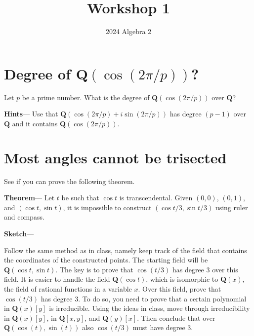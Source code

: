 \documentclass[12pt]{amsart}
\author{2024 Algebra 2}
\date{}
\title{Workshop 1}
\begin{document}
\maketitle
\section{Degree of \(\mathbf{Q}(\cos (2\pi/p))\)?}
\label{sec:org034cca3}
Let \(p\) be a prime number.
What is the degree of \(\mathbf{Q}(\cos (2\pi/p))\) over \(\mathbf{Q}\)?

\textbf{\textbf{Hints}}---
Use that \(\mathbf{Q}(\cos(2\pi/p) + i \sin(2\pi/p))\) has degree \((p-1)\) over \(\mathbf{Q}\) and it contains \(\mathbf{Q}(\cos(2\pi/p))\).
\section{Most angles cannot be trisected}
\label{sec:org6594949}
See if you can prove the following theorem.

\textbf{\textbf{Theorem}}---
Let \(t\) be such that \(\cos t\) is transcendental.
Given \((0,0)\), \((0,1)\), and \((\cos t, \sin t)\), it is impossible to construct \((\cos t/3, \sin t/3)\) using ruler and compass.

\textbf{\textbf{Sketch}}---

Follow the same method as in class, namely keep track of the field that contains the coordinates of the constructed points.
The starting field will be \(\mathbf{Q}(\cos t, \sin t)\).
The key is to prove that \(\cos (t/3)\) has degree 3 over this field.
It is easier to handle the field \(\mathbf{Q}(\cos t)\), which is isomorphic to \(\mathbf{Q}(x)\), the field of rational functions in a variable \(x\).
Over this field, prove that \(\cos(t/3)\) has degree 3.
To do so, you need to prove that a certain polynomial in \(\mathbf{Q}(x)[y]\) is irreducible.
Using the ideas in class, move through irreducibility in \(\mathbf{Q}(x)[y]\), in \(\mathbf{Q}[x,y]\), and \(\mathbf{Q}(y)[x]\).
Then conclude that over \(\mathbf{Q}(\cos(t), \sin(t))\) also \(\cos(t/3)\) must have degree 3.
\end{document}
